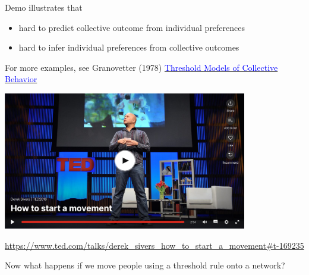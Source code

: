 \documentclass[aspectratio=169]{beamer}
\begin{document}
\begin{frame}

Demo illustrates that 
\begin{itemize}
\item hard to predict collective outcome from individual preferences
\pause
\item hard to infer individual preferences from collective outcomes
\end{itemize}

\vfill
\tiny{For more examples, see Granovetter (1978) \href{http://www.jstor.org/stable/2778111}{\textcolor{blue}{Threshold Models of Collective Behavior}}}

\end{frame}
\begin{frame}

\begin{center}
\includegraphics[width=0.8\textwidth]{figures/sivers_how_2010_title}
\end{center}

\vfill
\url{https://www.ted.com/talks/derek_sivers_how_to_start_a_movement\#t-169235}


\end{frame}
\begin{frame}

Now what happens if we move people using a threshold rule onto a network? 

\end{frame}
\end{document}
